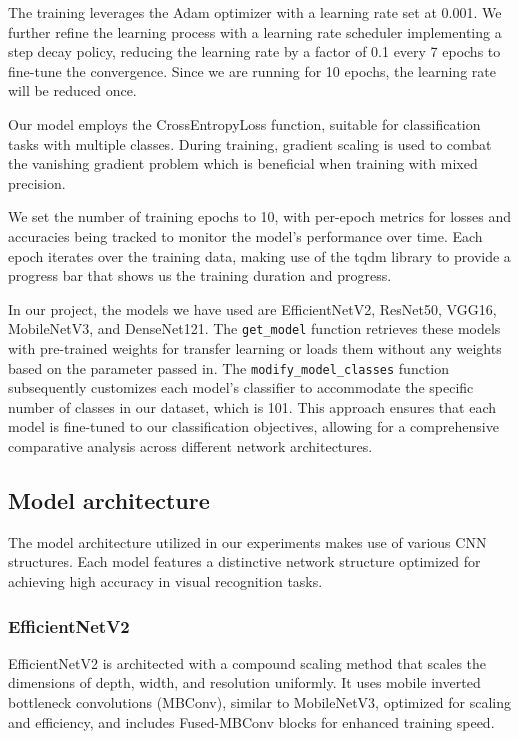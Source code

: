 \documentclass{article}
\begin{document}
The training leverages the Adam optimizer with a learning rate set at 0.001. We further refine the learning process with a learning rate scheduler implementing a step decay policy, reducing the learning rate by a factor of 0.1 every 7 epochs to fine-tune the convergence. Since we are running for 10 epochs, the learning rate will be reduced once.

Our model employs the CrossEntropyLoss function, suitable for classification tasks with multiple classes. During training, gradient scaling is used to combat the vanishing gradient problem which is beneficial when training with mixed precision.

We set the number of training epochs to 10, with per-epoch metrics for losses and accuracies being tracked to monitor the model's performance over time. Each epoch iterates over the training data, making use of the tqdm library to provide a progress bar that shows us the training duration and progress.

In our project, the models we have used are EfficientNetV2, ResNet50, VGG16, MobileNetV3, and DenseNet121.  The \verb|get_model| function retrieves these models with pre-trained weights for transfer learning or loads them without any weights based on the parameter passed in.  The \verb|modify_model_classes| function subsequently customizes each model's classifier to accommodate the specific number of classes in our dataset, which is 101. This approach ensures that each model is fine-tuned to our classification objectives, allowing for a comprehensive comparative analysis across different network architectures.

\subsection{Model architecture}

The model architecture utilized in our experiments makes use of various CNN structures. Each model features a distinctive network structure optimized for achieving high accuracy in visual recognition tasks.

\subsubsection*{EfficientNetV2}
EfficientNetV2 is architected with a compound scaling method that scales the dimensions of depth, width, and resolution uniformly. It uses mobile inverted bottleneck convolutions (MBConv), similar to MobileNetV3, optimized for scaling and efficiency, and includes Fused-MBConv blocks for enhanced training speed.
\end{document}
